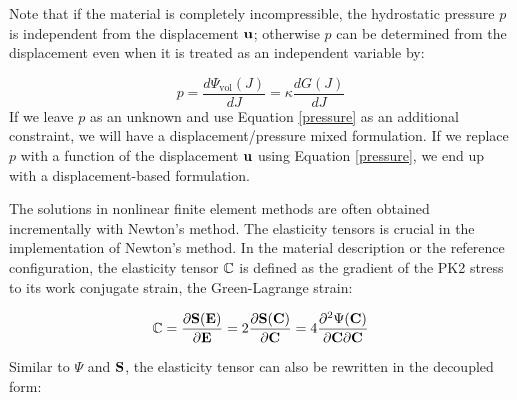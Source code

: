 Note that if the material is completely incompressible, the hydrostatic pressure $p$ is independent from the displacement $\bold{u}$; otherwise $p$ can be determined from the displacement even when it is treated as an independent variable by:

\begin{equation} \label{pressure}
p = \frac{d\Psi_\mathrm{vol}(J)}{dJ} = \kappa\frac{dG(J)}{dJ}
\end{equation}
If we leave $p$ as an unknown and use Equation \ref{pressure} as an additional constraint, we will have a displacement/pressure mixed formulation. If we replace $p$ with a function of the displacement $\bold{u}$ using Equation \ref{pressure}, we end up with a displacement-based formulation.

%
The solutions in nonlinear finite element methods are often obtained incrementally with Newton's method. The elasticity tensors is crucial in the implementation of Newton's method.
In the material description or the reference configuration, the elasticity tensor $\mathbb{C}$ is defined as the gradient of the PK2 stress to its work conjugate strain, the Green-Lagrange strain:

\begin{equation}
\mathbb{C} = \frac{\partial{\bold{S}(\bold{E})}}{\partial{\bold{E}}} =  2\frac{\partial{\bold{S}(\bold{C})}} {\partial{\bold{C}}} = 4 \frac{\partial^2{\Psi(\bold{C})}}{{\partial{\bold{C}}}{\partial{\bold{C}}}} \label{def_elasticity_tensor}
\end{equation}

Similar to $\Psi$ and $\bold{S}$, the elasticity tensor can also be rewritten in the decoupled form: 

